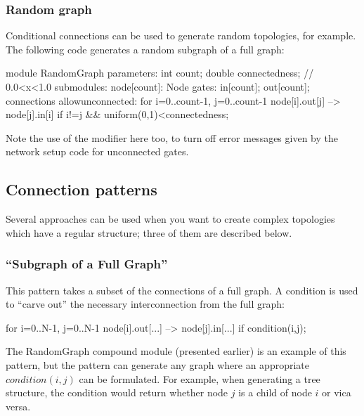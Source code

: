 \subsubsection{Random graph}

Conditional connections can be used to generate random
topologies, for example. The following code
generates a random subgraph of a full graph:

\begin{ned}
module RandomGraph {
    parameters:
        int count;
        double connectedness; // 0.0<x<1.0
    submodules:
        node[count]: Node {
            gates:
                in[count];
                out[count];
        }
    connections allowunconnected:
        for i=0..count-1, j=0..count-1 {
            node[i].out[j] --> node[j].in[i]
                if i!=j && uniform(0,1)<connectedness;
        }
}
\end{ned}

Note the use of the  modifier
here too, to turn off error messages given by the network setup code
for unconnected gates.


\subsection{Connection patterns}


Several approaches can be used when you want to create complex
topologies which have a regular structure; three of them are
described below.


\subsubsection{``Subgraph of a Full Graph''}


This pattern takes a subset of the connections of a full graph.  A
condition is used to ``carve out'' the necessary interconnection from
the full graph:

\begin{ned}
for i=0..N-1, j=0..N-1 {
    node[i].out[...] --> node[j].in[...] if condition(i,j);
}
\end{ned}

The RandomGraph compound module (presented earlier) is an example of
this pattern, but the pattern can generate any graph where an
appropriate $condition(i,j)$ can be formulated. For example,
when generating a tree structure, the condition
would return whether node $j$ is a child of node $i$ or
vica versa.

